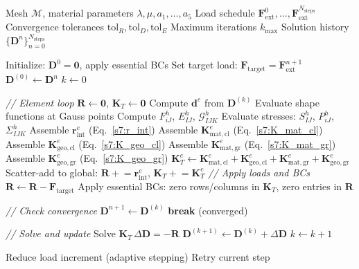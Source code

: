 \documentclass[11pt]{article}
\begin{document}
\begin{algorithm}[H]
\caption{Complete nonlinear FEM solver}
\label{alg:complete}
\begin{algorithmic}[1]
\REQUIRE Mesh $\mathcal{M}$, material parameters $\lambda,\mu,a_{1},\ldots,a_{5}$
\REQUIRE Load schedule $\mathbf{F}_{\mathrm{ext}}^{0},\ldots,\mathbf{F}_{\mathrm{ext}}^{N_{\mathrm{steps}}}$
\REQUIRE Convergence tolerances $\mathrm{tol}_{R},\mathrm{tol}_{D},\mathrm{tol}_{E}$
\REQUIRE Maximum iterations $k_{\max}$
\ENSURE Solution history $\{\mathbf{D}^{n}\}_{n=0}^{N_{\mathrm{steps}}}$

\STATE Initialize: $\mathbf{D}^{0}=\mathbf{0}$, apply essential BCs
  \STATE Set target load: $\mathbf{F}_{\mathrm{target}}=\mathbf{F}_{\mathrm{ext}}^{n+1}$
  \STATE $\mathbf{D}^{(0)}\leftarrow\mathbf{D}^{n}$
  \STATE $k\leftarrow 0$

    \STATE \textit{// Element loop}
    \STATE $\mathbf{R}\leftarrow\mathbf{0}$, $\mathbf{K}_{T}\leftarrow\mathbf{0}$
      \STATE Compute $\mathbf{d}^{e}$ from $\mathbf{D}^{(k)}$
      \STATE Evaluate shape functions at Gauss points
      \STATE Compute $F_{iJ}^{h}$, $E_{IJ}^{h}$, $\mathcal{G}_{IJK}^{h}$
      \STATE Evaluate stresses: $S_{IJ}^{h}$, $P_{iJ}^{h}$, $\Sigma_{IJK}^{h}$
      \STATE Assemble $\mathbf{r}_{\mathrm{int}}^{e}$ (Eq.~\eqref{s7:r_int})
      \STATE Assemble $\mathbf{K}_{\mathrm{mat,cl}}^{e}$ (Eq.~\eqref{s7:K_mat_cl})
      \STATE Assemble $\mathbf{K}_{\mathrm{geo,cl}}^{e}$ (Eq.~\eqref{s7:K_geo_cl})
      \STATE Assemble $\mathbf{K}_{\mathrm{mat,gr}}^{e}$ (Eq.~\eqref{s7:K_mat_gr})
      \STATE Assemble $\mathbf{K}_{\mathrm{geo,gr}}^{e}$ (Eq.~\eqref{s7:K_geo_gr})
      \STATE $\mathbf{K}_{T}^{e}\leftarrow\mathbf{K}_{\mathrm{mat,cl}}^{e}+\mathbf{K}_{\mathrm{geo,cl}}^{e}+\mathbf{K}_{\mathrm{mat,gr}}^{e}+\mathbf{K}_{\mathrm{geo,gr}}^{e}$
      \STATE Scatter-add to global: $\mathbf{R}\mathrel{+}=\mathbf{r}_{\mathrm{int}}^{e}$, $\mathbf{K}_{T}\mathrel{+}=\mathbf{K}_{T}^{e}$
    \ENDFOR
    \STATE \textit{// Apply loads and BCs}
    \STATE $\mathbf{R}\leftarrow\mathbf{R}-\mathbf{F}_{\mathrm{target}}$
    \STATE Apply essential BCs: zero rows/columns in $\mathbf{K}_{T}$, zero entries in $\mathbf{R}$

    \STATE \textit{// Check convergence}
      \STATE $\mathbf{D}^{n+1}\leftarrow\mathbf{D}^{(k)}$
      \STATE \textbf{break} (converged)
    \ENDIF

    \STATE \textit{// Solve and update}
    \STATE Solve $\mathbf{K}_{T}\,\Delta\mathbf{D}=-\mathbf{R}$
    \STATE $\mathbf{D}^{(k+1)}\leftarrow\mathbf{D}^{(k)}+\Delta\mathbf{D}$
    \STATE $k\leftarrow k+1$
  \ENDWHILE

    \STATE Reduce load increment (adaptive stepping)
    \STATE Retry current step
  \ENDIF
\ENDFOR
\end{algorithmic}
\end{algorithm}
\end{document}
